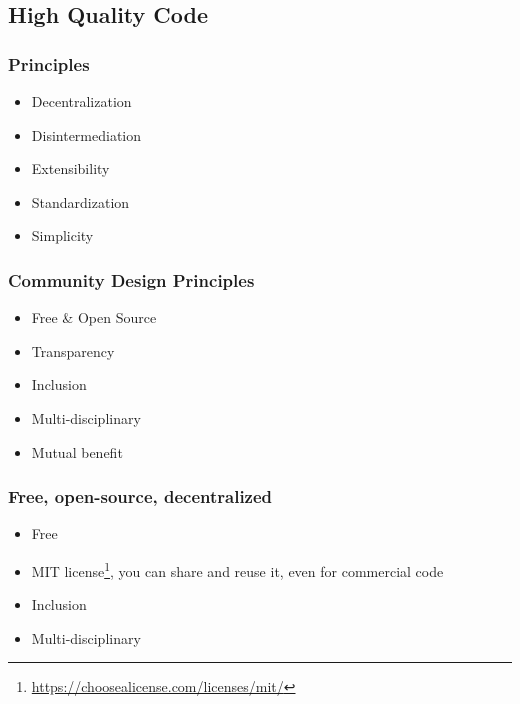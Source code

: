 \documentclass{beamer}
\begin{document}
\subsection{High Quality Code}

\begin{frame}
\frametitle{Principles}
\begin{itemize}
    \item Decentralization
    \item Disintermediation
    \item Extensibility
    \item Standardization
    \item Simplicity
\end{itemize}{}
    
\end{frame}


\begin{frame}
\frametitle{Community Design Principles}
\begin{itemize}
    \item Free \& Open Source
    \item Transparency
    \item Inclusion
    \item Multi-disciplinary
    \item Mutual benefit
\end{itemize}
\end{frame}


\begin{frame}
\frametitle{Free, open-source, decentralized}
\begin{itemize}
    \item Free  %
    \item MIT license\footnote{\href{https://choosealicense.com/licenses/mit/}{https://choosealicense.com/licenses/mit/}}, you can share and reuse it, even for commercial code
    \item Inclusion %
    \item Multi-disciplinary %
\end{itemize}
\end{frame}
\end{document}
